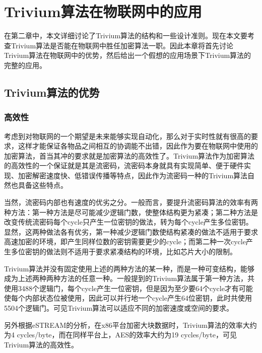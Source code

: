 
\chapter{Trivium算法在物联网中的应用}
\label{chap:use}

在第二章中，本文详细讨论了Trivium算法的结构和一些设计准则。现在本文要考查Trivium算法是否能在物联网中胜任加密算法一职。因此本章将首先讨论Trivium算法在物联网中的优势，然后给出一个假想的应用场景下Trivium算法的完整的应用。

\section{Trivium算法的优势}
\label{sec:advantage}

\subsection{高效性}

考虑到对物联网的一个期望是未来能够实现自动化，那么对于实时性就有很高的要求，这样才能保证各物品之间相互的协调能不出错，因此作为要在物联网中使用的加密算法，首当其冲的要求就是加密算法的高效性了。Trivium算法作为加密算法的高效性的一个保证就是其是流密码，流密码本身就具有实现简单、便于硬件实现、加密解密速度快、低错误传播等特点，因此作为流密码一种的Trivium算法自然也具备这些特点。

当然，流密码内部也有速度的优劣之分。一般而言，要提升流密码算法的效率有两种方法：第一种方法是尽可能减少逻辑门数，使整体结构更为紧凑；第二种方法是改变传统流密码每个cycle只产生一位密钥的做法，转为每个cycle产生多位密钥。显然，这两种做法各有优劣，第一种减少逻辑门数使结构紧凑的做法不适用于要求高速加密的环境，即产生同样位数的密钥需要更少的cycle；而第二种一次cycle产生多位密钥的做法则不适用于要求紧凑结构的环境，比如芯片大小的限制。

Trivium算法并没有固定使用上述的两种方法的某一种，而是一种可变结构，能够成为上述两种两种方法的任意一种。一般提到的Trivium算法属于第一种方法，共使用3488个逻辑门，每个cycle产生一位密钥，但是因为至少要64个cycle才有可能使每个内部状态位被使用，因此可以并行地一个cycle产生64位密钥，此时共使用5504个逻辑门。可见Trivium算法可以适应不同的加密速度或空间的要求。

另外根据eSTREAM的分析，在x86平台加密大块数据时，Trivium算法的效率大约为4 cycles/byte，而在同样平台上，AES的效率大约为19 cycles/byte，可见Trivium算法的高效性。

